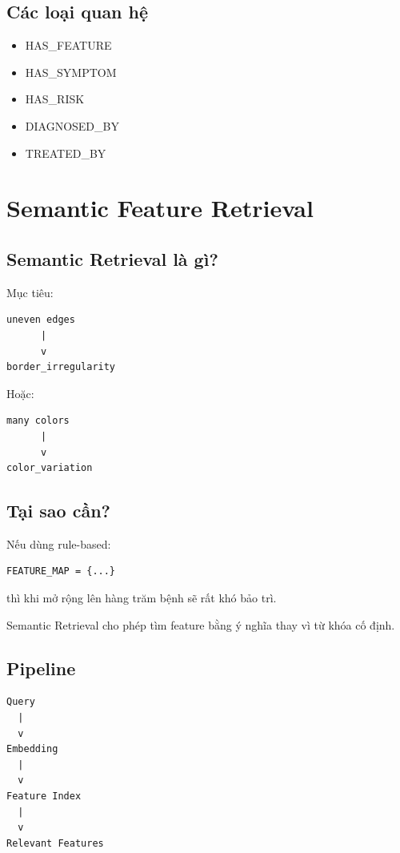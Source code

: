 \documentclass[12pt,a4paper]{article}
\begin{document}
\subsection{Các loại quan hệ}

\begin{itemize}
\item HAS\_FEATURE
\item HAS\_SYMPTOM
\item HAS\_RISK
\item DIAGNOSED\_BY
\item TREATED\_BY
\end{itemize}

\section{Semantic Feature Retrieval}

\subsection{Semantic Retrieval là gì?}

Mục tiêu:

\begin{verbatim}
uneven edges
      |
      v
border_irregularity
\end{verbatim}

Hoặc:

\begin{verbatim}
many colors
      |
      v
color_variation
\end{verbatim}

\subsection{Tại sao cần?}

Nếu dùng rule-based:

\begin{verbatim}
FEATURE_MAP = {...}
\end{verbatim}

thì khi mở rộng lên hàng trăm bệnh sẽ rất khó bảo trì.

Semantic Retrieval cho phép tìm feature bằng ý nghĩa thay vì từ khóa cố định.

\subsection{Pipeline}

\begin{verbatim}
Query
  |
  v
Embedding
  |
  v
Feature Index
  |
  v
Relevant Features
\end{verbatim}
\end{document}
